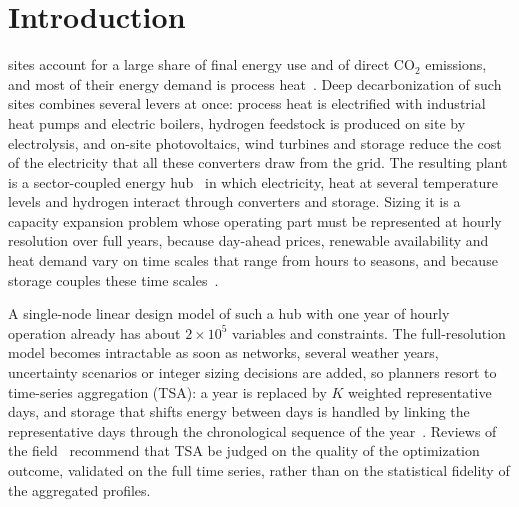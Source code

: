 \documentclass[journal]{IEEEtran}
\begin{document}
\section{Introduction}
 sites account for a large share of final energy use and of direct CO$_2$ emissions, and most of their energy demand is process heat~\cite{rissman2020industry}. Deep decarbonization of such sites combines several levers at once: process heat is electrified with industrial heat pumps and electric boilers, hydrogen feedstock is produced on site by electrolysis, and on-site photovoltaics, wind turbines and storage reduce the cost of the electricity that all these converters draw from the grid. The resulting plant is a sector-coupled energy hub~\cite{geidl2007energyhubs,mancarella2014mes} in which electricity, heat at several temperature levels and hydrogen interact through converters and storage. Sizing it is a capacity expansion problem whose operating part must be represented at hourly resolution over full years, because day-ahead prices, renewable availability and heat demand vary on time scales that range from hours to seasons, and because storage couples these time scales~\cite{gabrielli2018seasonal,brown2018synergies}.

A single-node linear design model of such a hub with one year of hourly operation already has about $2\times 10^{5}$ variables and constraints. The full-resolution model becomes intractable as soon as networks, several weather years, uncertainty scenarios or integer sizing decisions are added, so planners resort to time-series aggregation (TSA): a year is replaced by $K$ weighted representative days, and storage that shifts energy between days is handled by linking the representative days through the chronological sequence of the year~\cite{kotzur2018seasonal,pineda2018chronological}. Reviews of the field~\cite{hoffmann2020review,teichgraeber2022review} recommend that TSA be judged on the quality of the optimization outcome, validated on the full time series, rather than on the statistical fidelity of the aggregated profiles.
\end{document}
